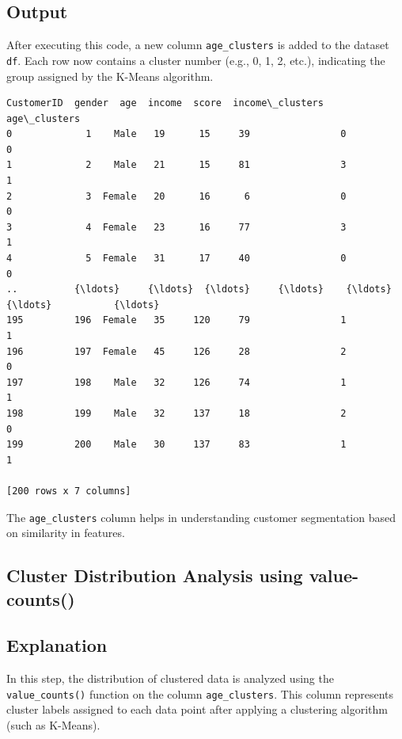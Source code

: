 \documentclass[11pt]{article}
\makeatletter
\newcommand{\boxspacing}{\kern\kvtcb@left@rule\kern\kvtcb@boxsep}
\newcommand{\prompt}[4]{
        {\ttfamily\llap{{\color{#2}[#3]:\hspace{3pt}#4}}\vspace{-\baselineskip}}
    }
\makeatother
\begin{document}
\subsection*{Output}
After executing this code, a new column \texttt{age\_clusters} is added to the dataset \texttt{df}. Each row now contains a cluster number (e.g., 0, 1, 2, etc.), indicating the group assigned by the K-Means algorithm.


\begin{tcolorbox}[breakable, size=fbox, boxrule=.5pt, pad at break*=1mm, opacityfill=0]
\prompt{Out}{outcolor}{24}{\boxspacing}
\begin{Verbatim}[commandchars=\\\{\}]
     CustomerID  gender  age  income  score  income\_clusters  age\_clusters
0             1    Male   19      15     39                0             0
1             2    Male   21      15     81                3             1
2             3  Female   20      16      6                0             0
3             4  Female   23      16     77                3             1
4             5  Female   31      17     40                0             0
..          {\ldots}     {\ldots}  {\ldots}     {\ldots}    {\ldots}              {\ldots}           {\ldots}
195         196  Female   35     120     79                1             1
196         197  Female   45     126     28                2             0
197         198    Male   32     126     74                1             1
198         199    Male   32     137     18                2             0
199         200    Male   30     137     83                1             1

[200 rows x 7 columns]
\end{Verbatim}
\end{tcolorbox}
The \texttt{age\_clusters} column helps in understanding customer segmentation based on similarity in features.

\subsection{Cluster Distribution Analysis using value-counts()}

\subsection*{Explanation}
In this step, the distribution of clustered data is analyzed using the \texttt{value\_counts()} function on the column \texttt{age\_clusters}. This column represents cluster labels assigned to each data point after applying a clustering algorithm (such as K-Means).
\end{document}
